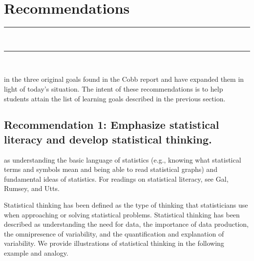 \chapter{Recommendations}
\vspace{-.53in}
   \noindent\color{graylight}\rule[0cm]{3.25in}{0.03cm} \\
    \noindent\color{graylight}\rule[0.4cm]{3.25in}{0.03cm} \\
\color{black}
\vspace{.05in}
 
 in the three original goals found in the Cobb report\cite{cobb1} and have expanded them in light of today's situation. The intent of these recommendations is to help students attain the list of learning goals described in the previous section.
 
 

\section{\textbf{Recommendation 1: Emphasize statistical literacy and develop statistical thinking.}}
 
 as understanding the basic language of statistics (e.g., knowing what statistical terms and symbols mean and being able to read statistical graphs) and fundamental ideas of statistics. For readings on statistical literacy, see Gal\cite{gal}, Rumsey\cite{rumsey}, and Utts\cite{utts}.
 
Statistical thinking has been defined as the type of thinking that statisticians use when approaching or solving statistical problems. Statistical thinking has been described as understanding the need for data, the importance of data production, the omnipresence of variability, and the quantification and explanation of variability\cite{cobb1}. We provide illustrations of statistical thinking in the following example and analogy.

